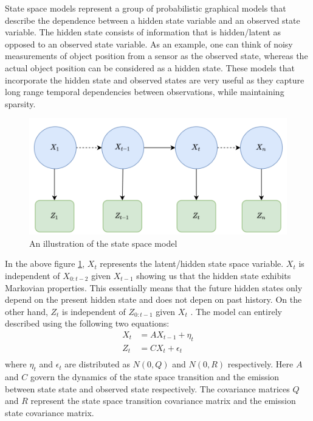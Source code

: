 \documentclass{article}
\begin{document}
State space models represent a group of probabilistic graphical models that describe the dependence between a hidden state variable and an observed state variable. The hidden state consists of information that is hidden/latent as opposed to an observed state variable. As an example, one can think of noisy measurements of object position from a sensor as the observed state, whereas the actual object position can be considered as a hidden state. These models that incorporate the hidden state and observed states are very useful as they capture long range temporal dependencies between observations, while maintaining sparsity.

\begin{figure}[H]
\centering
\includegraphics[scale=0.4]{theory/hmm.png}
\caption{An illustration of the state space model}
\label{fig:hmm}
\end{figure}

In the above figure \ref{fig:hmm}, $X_t$ represents the latent/hidden state space variable. $X_t$ is independent of $X_{0:t-2}$ given $X_{t-1}$ showing us that the hidden state  exhibits Markovian properties. This essentially means that the future hidden states only depend on the present hidden state and does not depen on past history. On the other hand, $Z_t$ is independent of $Z_{0:t-1}$ given $X_{t}$ . The model can entirely described using the following two equations:
\begin{equation}\label{eq:1}
\begin{split}
    X_{t}&=AX_{t-1} + \eta_t\\
    Z_{t}&=CX_{t}+\epsilon_t\\
\end{split}
\end{equation}
where $\eta_t$ and $\epsilon_t$ are distributed as $N(0,Q)$ and $N(0,R)$ respectively.  Here $A$ and $C$ govern the dynamics of the state space transition and the emission between state state and observed state respectively. The covariance matrices $Q$ and $R$ represent the state space transition covariance matrix and the emission state covariance matrix.
\end{document}

